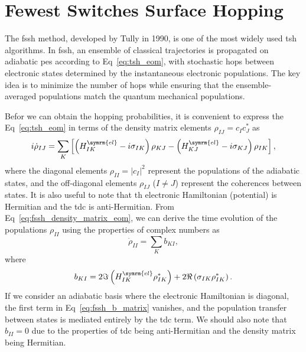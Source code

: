 \section{Fewest Switches Surface Hopping}\label{sec:fewest_switches}
The \acrfull{fssh} method, developed by Tully in 1990,\supercite{10.1063/1.459170} is one of the most widely used \acrshort{tsh} algorithms. In \acrshort{fssh}, an ensemble of classical trajectories is propagated on adiabatic \acrshort{pes} according to Eq~\eqref{eq:tsh_eom}, with stochastic hops between electronic states determined by the instantaneous electronic populations. The key idea is to minimize the number of hops while ensuring that the ensemble-averaged populations match the quantum mechanical populations.

Befor we can obtain the hopping probabilities, it is convenient to express the Eq~\eqref{eq:tsh_eom} in terms of the density matrix elements $\rho_{IJ}=c_I c_J^\ast$ as
\begin{equation}\label{eq:fssh_density_matrix_eom}
i\dot\rho_{IJ}=\sum_K\left[\left(H_{IK}^{\symrm{el}}-i\sigma_{IK}\right)\rho_{KJ}-\left(H_{KJ}^{\symrm{el}}-i\sigma_{KJ}\right)\rho_{IK}\right],
\end{equation}
where the diagonal elements $\rho_{II}=\lvert c_I\rvert^2$ represent the populations of the adiabatic states, and the off-diagonal elements $\rho_{IJ}$ ($I\neq J$) represent the coherences between states. It is also useful to note that th electronic Hamiltonian (potential) is Hermitian and the \acrshort{tdc} is anti-Hermitian. From Eq~\eqref{eq:fssh_density_matrix_eom}, we can derive the time evolution of the populations $\rho_{II}$ using the properties of complex numbers as
\begin{equation}\label{eq:fssh_population_eom}
\dot\rho_{II}=\sum_K b_{KI},
\end{equation}
where
\begin{equation}\label{eq:fssh_b_matrix}
b_{KI}=2\Im\left(H_{IK}^{\symrm{el}}\rho_{IK}^\ast\right)+2\Re\left(\sigma_{IK}\rho_{IK}^\ast\right).
\end{equation}
If we consider an adiabatic basis where the electronic Hamiltonian is diagonal, the first term in Eq~\eqref{eq:fssh_b_matrix} vanishes, and the population transfer between states is mediated entirely by the \acrshort{tdc} term. We should also note that $b_{II}=0$ due to the properties of \acrshort{tdc} being anti-Hermitian and the density matrix being Hermitian.

